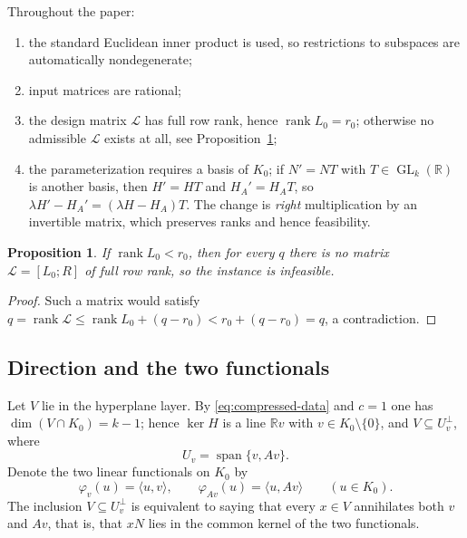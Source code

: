 \documentclass[journal]{IEEEtran}
\theoremstyle{plainn}
\newtheorem{prop}[thm]{Proposition}
\theoremstyle{remark}
\newcommand{\rank}{\operatorname{rank}}
\begin{document}
Throughout the paper:
\begin{enumerate}[label=(\roman*),leftmargin=*,itemsep=2pt]
\item the standard Euclidean inner product is used, so restrictions to subspaces are automatically
nondegenerate;
\item input matrices are rational;
\item the design matrix $\mathcal L$ has full row rank, hence $\rank L_0=r_0$; otherwise no admissible
$\mathcal L$ exists at all, see Proposition~\ref{prop:rankprecheck};
\item the parameterization requires a basis of $K_0$; if $N'=NT$ with $T\in\operatorname{GL}_k(\mathbb R)$
is another basis, then $H'=HT$ and $H_A'=H_AT$, so $\lambda H'-H_A'=(\lambda H-H_A)T$. The change is
\emph{right} multiplication by an invertible matrix, which preserves ranks and hence feasibility.
\end{enumerate}

\begin{prop}
  \label{prop:rankprecheck}
  If $\rank L_0<r_0$, then for every $q$ there is no matrix $\mathcal L=[L_0;R]$ of full row rank, so
  the instance is infeasible.
\end{prop}

\begin{proof}
  Such a matrix would satisfy
  $q=\rank\mathcal L\le\rank L_0+(q-r_0)<r_0+(q-r_0)=q$, a contradiction.
\end{proof}

\subsection{Direction and the two functionals}
\label{sec:prelim:direction}

Let $V$ lie in the hyperplane layer. By \eqref{eq:compressed-data} and $c=1$ one has $\dim(V\cap K_0)=k-1$;
hence $\ker H$ is a line $\mathbb R v$ with $v\in K_0\setminus\{0\}$, and $V\subseteq U_v^\perp$,
where
\begin{equation}
  \label{eq:Uv}
  U_v=\operatorname{span}\{v,Av\}.
\end{equation}
Denote the two linear functionals on $K_0$ by
\begin{equation}
  \label{eq:functionals}
  \varphi_v(u)=\langle u,v\rangle,\qquad \varphi_{Av}(u)=\langle u,Av\rangle
  \qquad(u\in K_0).
\end{equation}
The inclusion $V\subseteq U_v^\perp$ is equivalent to saying that every $x\in V$ annihilates both $v$
and $Av$, that is, that $xN$ lies in the common kernel of the two functionals.
\end{document}
